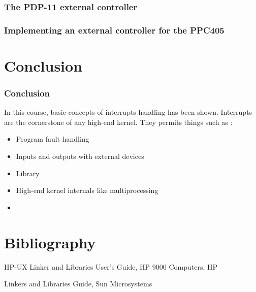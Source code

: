 
\begin{frame}
  \frametitle{The PDP-11 external controller}

\end{frame}


\begin{frame}
  \frametitle{Implementing an external controller for the PPC405}

 \begin{center}
  \end{center}



\end{frame}







%
%

\section{Conclusion}


\begin{frame}
  \frametitle{Conclusion}

  In this course, basic concepts of interrupts handling has been shown. Interrupts are the cornerstone of any high-end kernel. They permits things such as :

 \begin{itemize}
    \item
        Program fault handling
    \item
        Inputs and outputs with external devices
    \item
        Library
    \item
        High-end kernel internals like multiprocessing
    \item
      \etc{}
  \end{itemize}

\end{frame}



%
%

\section{Bibliography}

\begin{thebibliography}{3}
HP-UX Linker and Libraries User's Guide, HP 9000 Computers, HP

Linkers and Libraries Guide, Sun Microsystems

\end{thebibliography}



